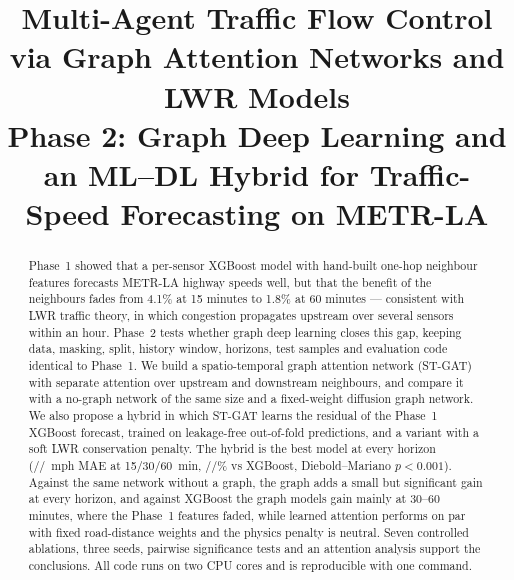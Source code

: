 \documentclass[conference]{IEEEtran}
\begin{document}
\title{Multi-Agent Traffic Flow Control via Graph Attention Networks and LWR Models\\
\large Phase 2: Graph Deep Learning and an ML--DL Hybrid for Traffic-Speed Forecasting on METR-LA}

\author{
}

\maketitle

\begin{abstract}
Phase~1 showed that a per-sensor XGBoost model with hand-built one-hop neighbour features forecasts METR-LA highway speeds well, but that the benefit of the neighbours fades from 4.1\% at 15 minutes to 1.8\% at 60 minutes --- consistent with LWR traffic theory, in which congestion propagates upstream over several sensors within an hour. Phase~2 tests whether graph deep learning closes this gap, keeping data, masking, split, history window, horizons, test samples and evaluation code identical to Phase~1. We build a spatio-temporal graph attention network (ST-GAT) with separate attention over upstream and downstream neighbours, and compare it with a no-graph network of the same size and a fixed-weight diffusion graph network. We also propose a hybrid in which ST-GAT learns the residual of the Phase~1 XGBoost forecast, trained on leakage-free out-of-fold predictions, and a variant with a soft LWR conservation penalty. The hybrid is the best model at every horizon (\pMaeHybFifteen/\pMaeHybThirty/\pMaeHybSixty~mph MAE at 15/30/60~min, \pChgHybFifteen/\pChgHybThirty/\pChgHybSixty\% vs XGBoost, Diebold--Mariano $p<0.001$). Against the same network without a graph, the graph adds a small but significant gain at every horizon, and against XGBoost the graph models gain mainly at 30--60 minutes, where the Phase~1 features faded, while learned attention performs on par with fixed road-distance weights and the physics penalty is neutral. Seven controlled ablations, three seeds, pairwise significance tests and an attention analysis support the conclusions. All code runs on two CPU cores and is reproducible with one command.
\end{abstract}
\end{document}

